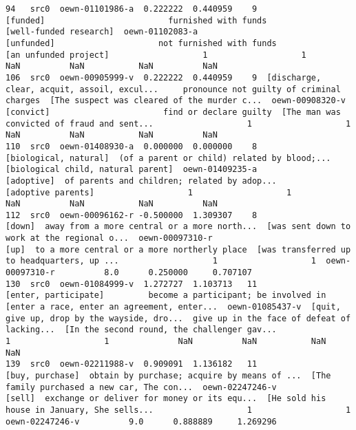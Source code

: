 \documentclass[a4paper,10pt,onecolumn,oneside,openright]{article}
\begin{document}
\begin{verbatim}
94   src0  oewn-01101986-a  0.222222  0.440959    9                                     [funded]                         furnished with funds                       [well-funded research]  oewn-01102083-a                                   [unfunded]                     not furnished with funds                        [an unfunded project]                   1                   1              NaN          NaN           NaN          NaN
106  src0  oewn-00905999-v  0.222222  0.440959    9  [discharge, clear, acquit, assoil, excul...     pronounce not guilty of criminal charges  [The suspect was cleared of the murder c...  oewn-00908320-v                                    [convict]                       find or declare guilty  [The man was convicted of fraud and sent...                   1                   1              NaN          NaN           NaN          NaN
110  src0  oewn-01408930-a  0.000000  0.000000    8                        [biological, natural]  (of a parent or child) related by blood;...           [biological child, natural parent]  oewn-01409235-a                                   [adoptive]  of parents and children; related by adop...                           [adoptive parents]                   1                   1              NaN          NaN           NaN          NaN
112  src0  oewn-00096162-r -0.500000  1.309307    8                                       [down]  away from a more central or a more north...  [was sent down to work at the regional o...  oewn-00097310-r                                         [up]  to a more central or a more northerly place  [was transferred up to headquarters, up ...                   1                   1  oewn-00097310-r          8.0      0.250000     0.707107
130  src0  oewn-01084999-v  1.272727  1.103713   11                         [enter, participate]         become a participant; be involved in  [enter a race, enter an agreement, enter...  oewn-01085437-v  [quit, give up, drop by the wayside, dro...  give up in the face of defeat of lacking...  [In the second round, the challenger gav...                   1                   1              NaN          NaN           NaN          NaN
139  src0  oewn-02211988-v  0.909091  1.136182   11                              [buy, purchase]  obtain by purchase; acquire by means of ...  [The family purchased a new car, The con...  oewn-02247246-v                                       [sell]  exchange or deliver for money or its equ...  [He sold his house in January, She sells...                   1                   1  oewn-02247246-v          9.0      0.888889     1.269296

\end{verbatim}
\end{document}
